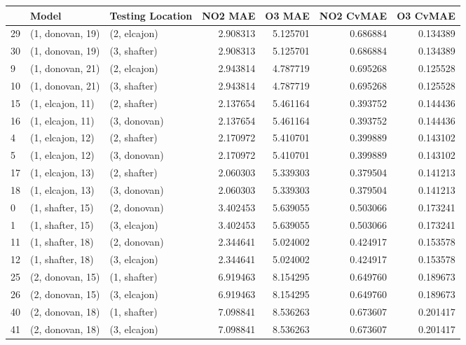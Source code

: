\begin{tabular}{lllrrrr}
\toprule
{} &             Model & Testing Location &   NO2 MAE &    O3 MAE &  NO2 CvMAE &  O3 CvMAE \\
\midrule
29 &  (1, donovan, 19) &     (2, elcajon) &  2.908313 &  5.125701 &   0.686884 &  0.134389 \\
30 &  (1, donovan, 19) &     (3, shafter) &  2.908313 &  5.125701 &   0.686884 &  0.134389 \\
9  &  (1, donovan, 21) &     (2, elcajon) &  2.943814 &  4.787719 &   0.695268 &  0.125528 \\
10 &  (1, donovan, 21) &     (3, shafter) &  2.943814 &  4.787719 &   0.695268 &  0.125528 \\
15 &  (1, elcajon, 11) &     (2, shafter) &  2.137654 &  5.461164 &   0.393752 &  0.144436 \\
16 &  (1, elcajon, 11) &     (3, donovan) &  2.137654 &  5.461164 &   0.393752 &  0.144436 \\
4  &  (1, elcajon, 12) &     (2, shafter) &  2.170972 &  5.410701 &   0.399889 &  0.143102 \\
5  &  (1, elcajon, 12) &     (3, donovan) &  2.170972 &  5.410701 &   0.399889 &  0.143102 \\
17 &  (1, elcajon, 13) &     (2, shafter) &  2.060303 &  5.339303 &   0.379504 &  0.141213 \\
18 &  (1, elcajon, 13) &     (3, donovan) &  2.060303 &  5.339303 &   0.379504 &  0.141213 \\
0  &  (1, shafter, 15) &     (2, donovan) &  3.402453 &  5.639055 &   0.503066 &  0.173241 \\
1  &  (1, shafter, 15) &     (3, elcajon) &  3.402453 &  5.639055 &   0.503066 &  0.173241 \\
11 &  (1, shafter, 18) &     (2, donovan) &  2.344641 &  5.024002 &   0.424917 &  0.153578 \\
12 &  (1, shafter, 18) &     (3, elcajon) &  2.344641 &  5.024002 &   0.424917 &  0.153578 \\
25 &  (2, donovan, 15) &     (1, shafter) &  6.919463 &  8.154295 &   0.649760 &  0.189673 \\
26 &  (2, donovan, 15) &     (3, elcajon) &  6.919463 &  8.154295 &   0.649760 &  0.189673 \\
40 &  (2, donovan, 18) &     (1, shafter) &  7.098841 &  8.536263 &   0.673607 &  0.201417 \\
41 &  (2, donovan, 18) &     (3, elcajon) &  7.098841 &  8.536263 &   0.673607 &  0.201417 \\

\end{tabular}
